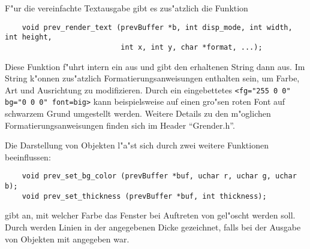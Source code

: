 F"ur die vereinfachte Textausgabe gibt es zus"atzlich die Funktion
\begin{small}
\linespread{0.9}
\begin{verbatim}
    void prev_render_text (prevBuffer *b, int disp_mode, int width, int height,
                           int x, int y, char *format, ...);
\end{verbatim}
\end{small}
Diese Funktion f"uhrt intern ein  aus und gibt den
erhaltenen String dann aus. Im String k"onnen zus"atzlich
Formatierungsanweisungen enthalten sein, um Farbe, Art und
Ausrichtung zu modifizieren. Durch ein eingebettetes
\verb|<fg="255 0 0" bg="0 0 0" font=big>| kann beispielsweise auf
einen gro"sen roten Font auf schwarzem Grund umgestellt werden. Weitere
Details zu den m"oglichen Formatierungsanweisungen finden sich im
Header ``Grender.h''.

Die Darstellung von Objekten l"a"st sich durch zwei weitere
Funktionen beeinflussen:
\begin{small}
\linespread{0.9}
\begin{verbatim}
    void prev_set_bg_color (prevBuffer *buf, uchar r, uchar g, uchar b);
    void prev_set_thickness (prevBuffer *buf, int thickness);
\end{verbatim}
\end{small}
 gibt an, mit welcher Farbe das Fenster
bei Auftreten von  gel"oscht werden soll. Durch
 werden Linien in der angegebenen Dicke
gezeichnet, falls  bei der Ausgabe von Objekten
mit angegeben war.

